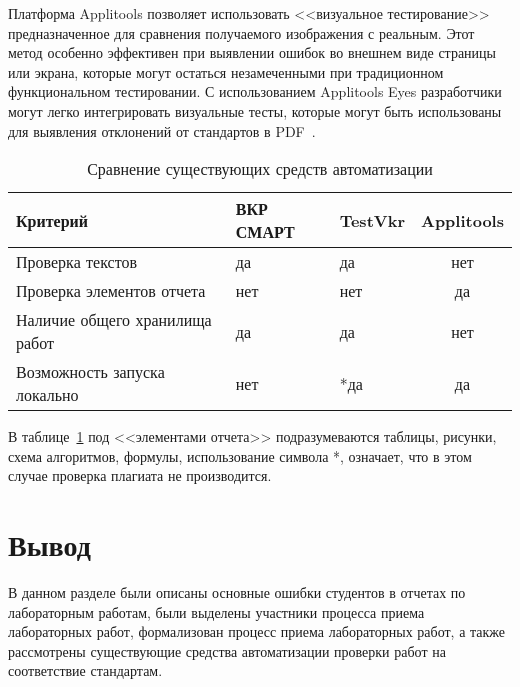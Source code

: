 Платформа Applitools позволяет использовать <<визуальное тестирование>> предназначенное для сравнения получаемого изображения с реальным. Этот метод особенно эффективен при выявлении ошибок во внешнем виде страницы или экрана, которые могут остаться незамеченными при традиционном функциональном тестировании. С использованием Applitools Eyes разработчики могут легко интегрировать визуальные тесты, которые могут быть использованы для выявления отклонений от стандартов в PDF~\cite{PdfTest}.



\begin{table}[ht]
	\begin{center}
		\begin{threeparttable}
			\caption{\label{t:cmp} Сравнение существующих средств автоматизации}
			\begin{tabular}{|p{4cm}|p{4cm}|p{4cm}|c|}
				\hline
				\textbf{Критерий} & \textbf{ВКР СМАРТ} & \textbf{TestVkr} & \textbf{Applitools} \\ \hline
				Проверка текстов  & да & да & нет\\ \hline
				Проверка элементов отчета & нет & нет & да \\ \hline
				Наличие общего хранилища работ  & да & да & нет \\ \hline
				Возможность запуска локально & нет & *да & да \\ \hline
			\end{tabular}
		\end{threeparttable}
	\end{center}
\end{table}


В таблице~\ref{t:cmp} под <<элементами отчета>> подразумеваются таблицы, рисунки, схема алгоритмов, формулы, использование символа *, означает, что в этом случае проверка плагиата не производится.


\section*{Вывод}
В данном разделе были описаны основные ошибки студентов в отчетах по лабораторным работам, были выделены участники процесса приема лабораторных работ, формализован процесс приема лабораторных работ, а также рассмотрены существующие средства автоматизации проверки работ на соответствие стандартам.

